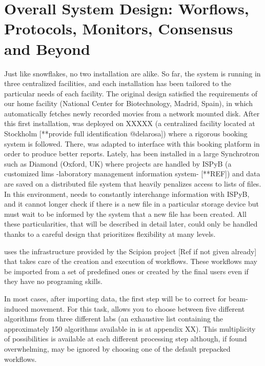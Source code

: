 \section{Overall System Design: Worflows, Protocols, Monitors, Consensus and Beyond}
\label{overall}
Just like snowflakes, no two \scipionbox installation are alike. So far, the system is running in 
three centralized facilities, and each installation has been tailored to the particular needs of each facility. The original design satisfied the requirements of our home facility (National Center for Biotechnology, Madrid, Spain), in which \scipionbox automatically fetches newly recorded movies from a network mounted disk. After this first installation, \scipionbox was deployed on XXXXX (a centralized facility located at Stockholm [**provide full identification @delarosa]) where a rigorous booking system is followed. There, \scipionbox was adapted to interface with this booking platform in order to produce better reports. Lately,  \scipionbox has been installed in a large Synchrotron  such as Diamond (Oxford, UK) where projects are handled by ISPyB (a customized lims -laboratory management information system- [**REF]) and data are saved on a distributed file system that heavily penalizes access to lists of files. In this environment, \scipionbox needs to constantly interchange information with ISPyB, and it cannot longer check if there is a new file in a particular storage device but must wait to be informed by the system that a new file has been created. All these particularities, that will be described in detail later, could only be handled thanks to a careful design that prioritizes flexibility at many levels. 

\scipionbox uses the infrastructure provided by the Scipion project [Ref if not given already]
that takes care of the creation and execution of workflows. These workflows may be imported from a set of predefined ones or created by the final users even if they have no programing skills.

In most cases, after importing data, the first step will be to correct for beam-induced movement. For this task, \scipionbox allows you to choose between five different algorithms from three different labs (an exhaustive list containing the approximately 150 algorithms available in \scipionbox is at appendix XX). This multiplicity of possibilities is available at each different processing step although, if found overwhelming, may be ignored by choosing one of the default prepacked workflows.   

